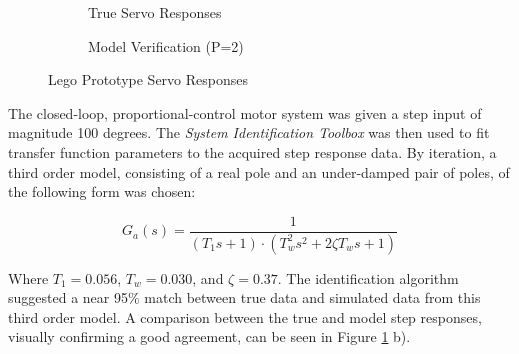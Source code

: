 \begin{figure}[H]
	\begin{subfigure}[t]{0.5\textwidth}
	\caption{True Servo Responses}
	\end{subfigure}
	\begin{subfigure}[t]{0.5\textwidth}
	\caption{Model Verification (P=2)}
	\end{subfigure}
	\caption{Lego Prototype Servo Responses}
	\label{fig:ServoModel}
\end{figure}

The closed-loop, proportional-control motor system was given a step input of magnitude 100 degrees. The \textit{System Identification Toolbox} was then used to fit transfer function parameters to the acquired step response data. By iteration, a third order model, consisting of a real pole and an under-damped pair of poles, of the following form was chosen:

\begin{equation}
G_a(s) = \frac{1}{(T_1 s + 1) \cdot (T^2_w s^2 + 2 \zeta T_w s + 1)}
\end{equation}

Where $T_1 = 0.056$, $T_w = 0.030$, and $\zeta = 0.37$. The identification algorithm suggested a near 95\% match between true data and simulated data from this third order model. A comparison between the true and model step responses, visually confirming a good agreement, can be seen in Figure \ref{fig:ServoModel} b). \\

